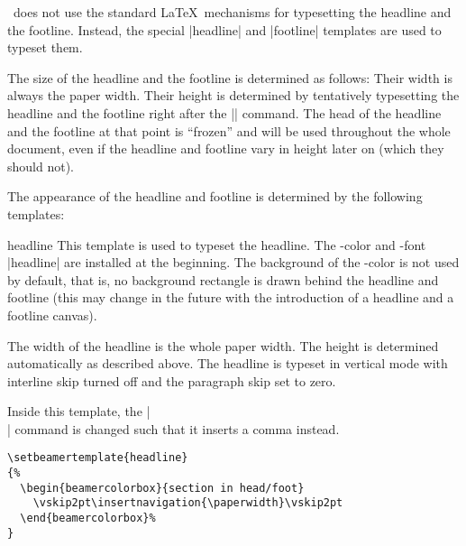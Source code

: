 \beamer\ does not use the standard \LaTeX\ mechanisms for typesetting
the headline and the footline. Instead, the special |headline| and
|footline| templates are used to typeset them.

The size of the headline and the footline is determined as follows:
Their width is always the paper width. Their height is determined by
tentatively typesetting the headline and the footline right after the
|| command. The head of the headline and the footline
at that point is ``frozen'' and will be used throughout the whole
document, even if the headline and footline vary in height later on
(which they should not).

The appearance of the headline and footline is determined by the
following templates:

\begin{element}{headline}\yes\yes\yes
  This template is used to typeset the headline. The \beamer-color and
  -font |headline| are installed at the beginning. The background of
  the \beamer-color is not used by default, that is, no background
  rectangle is drawn behind the headline and footline (this may change
  in the future with the introduction of a headline and a footline
  canvas).

  The width of the headline is the whole paper width. The height is
  determined automatically as described above. The headline is typeset
  in vertical mode with interline skip turned off and the paragraph
  skip set to zero.

  Inside this template, the |\\| command is changed such that it
  inserts a comma instead.

  \example
\begin{verbatim}
\setbeamertemplate{headline}
{%
  \begin{beamercolorbox}{section in head/foot}
    \vskip2pt\insertnavigation{\paperwidth}\vskip2pt
  \end{beamercolorbox}%
}
\end{verbatim}


\end{element}
